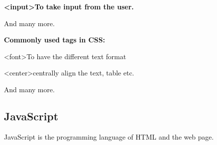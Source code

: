 \documentclass[12pt]{report}
\renewcommand{\_}{\kern-1.5pt\textunderscore\kern-1.5pt}
\begin{document}
\begin{adjustwidth}{0.3in}{0.84in}
\textbf{\textcolor[HTML]{0D0D0D}{ <input>\tab \tab \tab To take input from the user.}}\par

\end{adjustwidth}

\begin{adjustwidth}{1.4in}{0.84in}
\textcolor[HTML]{0D0D0D}{And many more.}\par

\end{adjustwidth}


\vspace{\baselineskip}
\begin{adjustwidth}{0.3in}{0.84in}
\textbf{\textcolor[HTML]{0D0D0D}{Commonly used tags in CSS:}}\par

\end{adjustwidth}

\begin{adjustwidth}{0.3in}{0.84in}
\textcolor[HTML]{0D0D0D}{<font>\tab \tab To have the different text format}\par

\end{adjustwidth}

\begin{adjustwidth}{0.3in}{0.84in}
\textcolor[HTML]{0D0D0D}{<center>\tab \tab centrally align the text, table etc.}\par

\end{adjustwidth}

\begin{adjustwidth}{1.4in}{0.84in}
\textcolor[HTML]{0D0D0D}{And many more.}\par

\end{adjustwidth}


\vspace{\baselineskip}
\subsection{JavaScript }
\setlength{\parskip}{14.4pt}
\begin{adjustwidth}{0.3in}{0.84in}
\textcolor[HTML]{0D0D0D}{JavaScript is the programming language of HTML and the web page.}\par

\end{adjustwidth}
\end{document}
